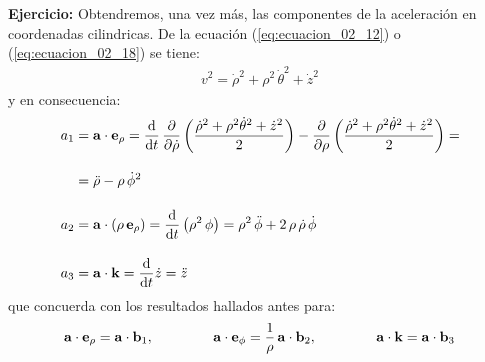 \documentclass[12pt]{article}
\begin{document}
\noindent
\textbf{Ejercicio: } Obtendremos, una vez más, las componentes de la aceleración en coordenadas cilindricas. De la ecuación (\ref{eq:ecuacion_02_12}) o (\ref{eq:ecuacion_02_18}) se tiene:
\begin{align*}
    v^{2} = \dot{\rho}^{2} + \rho^{2} \, \dot{\theta}^{2} + \dot{z}^{2}
\end{align*}
y en consecuencia:
\begin{align*}
    a_{1} &= \vb{a} \cdot \vb{e}_{\rho} = \dv{t} \, \pdv{\dot{\rho}} \left( \dfrac{\dot{\rho}^{2} + \rho^{2} \dot{\theta}^{2} + \dot{z}^{2}}{2} \right) - \pdv{\rho} \left( \dfrac{\dot{\rho}^{2} + \rho^{2} \dot{\theta}^{2} + \dot{z}^{2}}{2} \right) = \\[1em]
    &= \ddot{\rho} - \rho \, \dot{\phi}^{2} \\[1em]
    a_{2} &= \vb{a} \cdot \left( \rho \, \vb{e}_{\rho} \right) = \dv{t} \left( \rho^{2} \, \phi \right) = \rho^{2} \, \ddot{\phi} + 2 \, \rho \, \dot{\rho} \, \dot{\phi} \\[1em]
    a_{3} &= \vb{a} \cdot \vb{k} = \dv{t} \dot{z} = \ddot{z}
\end{align*}
que concuerda con los resultados hallados antes para:
\begin{align*}
    \vb{a} \cdot \vb{e}_{\rho} = \vb{a} \cdot \vb{b}_{1}, \hspace{1.5cm} \vb{a} \cdot \vb{e}_{\phi} =\dfrac{1}{\rho} \, \vb{a} \cdot \vb{b}_{2}, \hspace{1.5cm} \vb{a} \cdot \vb{k} = \vb{a} \cdot \vb{b}_{3}
\end{align*}
\end{document}
